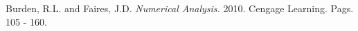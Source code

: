 
 Burden, R.L. and Faires, J.D. {\em Numerical Analysis.} 2010. Cengage Learning. Pags. 105 - 160.


